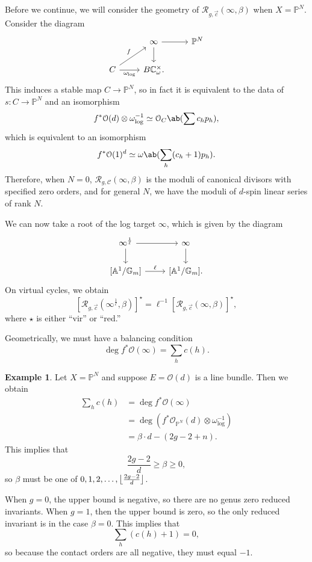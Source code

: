 \documentclass[10pt,oldfontcommands,oneside]{memoir}
\DeclarePairedDelimiter{\floor}{\lfloor}{\rfloor}
\theoremstyle{definition}
\newtheorem{exm}[thm]{Example}
\theoremstyle{remark}
\theoremstyle{plain}
\theoremstyle{definition}
\theoremstyle{remark}
\newcommand{\A}{\mathbb{A}}
\newcommand{\G}{\mathbb{G}}
\newcommand{\C}{\mathbb{C}}
\renewcommand{\P}{\mathbb{P}}
\newcommand{\mc}[1]{\mathcal{#1}}
\newcommand{\1}{\mathbf{1}}
\newcommand{\2}{\mathbf{2}}
\newcommand{\3}{\mathbf{3}}
\begin{document}
Before we continue, we will consider the geometry of $\mc{R}_{g, \vec{c}}(\infty, \beta)$ when $X = \P^N$. Consider the diagram
\begin{equation*}
\begin{tikzcd}
    & \infty \ar{r} \ar{d} & \P^N \\
    C \ar{ur}{f} \ar[swap]{r}{\omega_{\log}} & B \C_{\omega}^{\times}.
\end{tikzcd}
\end{equation*}
This induces a stable map $C \to \P^N$, so in fact it is equivalent to the data of $s \colon C \to \P^N$ and an isomorphism
\[ f^* \mc{O}(d) \otimes \omega_{\log}^{-1} \simeq \mc{O}_C\ab(\sum c_h p_h), \]
which is equivalent to an isomorphism
\[ f^* \mc{O}(1)^d \simeq \omega \ab(\sum_h (c_h+1)p_h). \]
Therefore, when $N = 0$, $\mc{R}_{g,\mc{C}}(\infty, \beta)$ is the moduli of canonical divisors with specified zero orders, and for general $N$, we have the moduli of $d$-spin linear series of rank $N$.

We can now take a root of the log target $\infty$, which is given by the diagram
\begin{equation*}
\begin{tikzcd}
    \infty^{\frac{1}{\ell}} \ar{r} \ar{d} & \infty \ar{d} \\
    {[\A^1/\G_m]} \ar{r}{\ell} & {[\A^1/\G_m]}.
\end{tikzcd}
\end{equation*}
On virtual cycles, we obtain
\[ [\mc{R}_{g, \vec{c}}(\infty^{\frac{1}{\ell}}, \beta)]^{\star} = \ell^{-1} [\mc{R}_{g, \vec{c}}(\infty, \beta)]^{\star}, \]
where $\star$ is either ``vir'' or ``red.''

Geometrically, we must have a balancing condition
\[ \deg f^* \mc{O}(\infty) = \sum_h c(h). \]

\begin{exm}
    Let $X = \P^N$ and suppose $E = \mc{O}(d)$ is a line bundle. Then we obtain
    \begin{align*}
        \sum_h c(h) &= \deg f^* \mc{O}(\infty) \\
        &= \deg (f^* \mc{O}_{\P^N}(d)\otimes \omega_{\log}^{-1}) \\
        &= \beta \cdot d - (2g-2+n).
    \end{align*}
    This implies that
    \[ \frac{2g-2}{d} \geq \beta \geq 0, \]
    so $\beta$ must be one of $0,1,2,\ldots,\floor*{\frac{2g-2}{d}}$.

    When $g=0$, the upper bound is negative, so there are no genus zero reduced invariants. When $g=1$, then the upper bound is zero, so the only reduced invariant is in the case $\beta = 0$. This implies that
    \[ \sum_h (c(h)+1) = 0, \]
    so because the contact orders are all negative, they must equal $-1$.
\end{exm}
\end{document}
